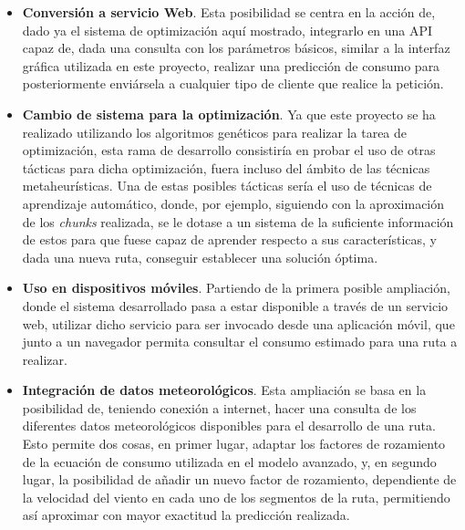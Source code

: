 \documentclass[11pt,spanish,listoffigures,listoftables]{tfgetsinf}
\begin{document}
\begin{itemize}
    \item \textbf{Conversión a servicio Web}. Esta posibilidad se centra en la acción de, dado ya el sistema de optimización aquí mostrado, integrarlo en una API capaz de, dada una consulta con los parámetros básicos, similar a la interfaz gráfica utilizada en este proyecto, realizar una predicción de consumo para posteriormente enviársela a cualquier tipo de cliente que realice la petición.
    
    \item \textbf{Cambio de sistema para la optimización}. Ya que este proyecto se ha realizado utilizando los algoritmos genéticos para realizar la tarea de optimización, esta rama de desarrollo consistiría en probar el uso de otras tácticas para dicha optimización, fuera incluso del ámbito de las técnicas metaheurísticas. Una de estas posibles tácticas sería el uso de técnicas de aprendizaje automático, donde, por ejemplo, siguiendo con la aproximación de los \textit{chunks} realizada, se le dotase a un sistema de la suficiente información de estos para que fuese capaz de aprender respecto a sus características, y dada una nueva ruta, conseguir establecer una solución óptima.
    
    \item \textbf{Uso en dispositivos móviles}. Partiendo de la primera posible ampliación, donde el sistema desarrollado pasa a estar disponible a través de un servicio web, utilizar dicho servicio para ser invocado desde una aplicación móvil, que junto a un navegador permita consultar el consumo estimado para una ruta a realizar.
    
    \item \textbf{Integración de datos meteorológicos}. Esta ampliación se basa en la posibilidad de, teniendo conexión a internet, hacer una consulta de los diferentes datos meteorológicos disponibles para el desarrollo de una ruta. Esto permite dos cosas, en primer lugar, adaptar los factores de rozamiento de la ecuación de consumo utilizada en el modelo avanzado, y, en segundo lugar, la posibilidad de añadir un nuevo factor de rozamiento, dependiente de la velocidad del viento en cada uno de los segmentos de la ruta, permitiendo así aproximar con mayor exactitud la predicción realizada.
\end{itemize}


\nocite{*}
\printbibliography
\end{document}
